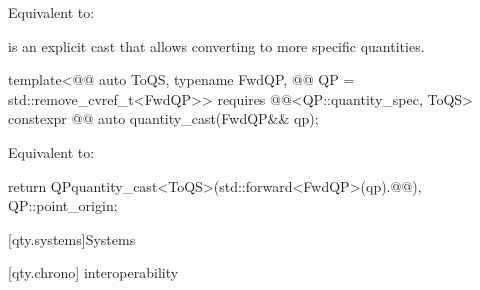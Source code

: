 \begin{itemdescr}
\pnum
\effects
Equivalent to:
\end{itemdescr}

\pnum
{} is an explicit cast that allows converting to more specific quantities.

\begin{itemdecl}
template<@@ auto ToQS, typename FwdQP, @@ QP = std::remove_cvref_t<FwdQP>>
  requires @@<QP::quantity_spec, ToQS>
constexpr @@ auto quantity_cast(FwdQP&& qp);
\end{itemdecl}

\begin{itemdescr}
\pnum
\effects
Equivalent to:
\begin{codeblock}
return QP{quantity_cast<ToQS>(std::forward<FwdQP>(qp).@@),
          QP::point_origin};
\end{codeblock}
\end{itemdescr}

[qty.systems]{Systems}

[qty.chrono]{ interoperability}

